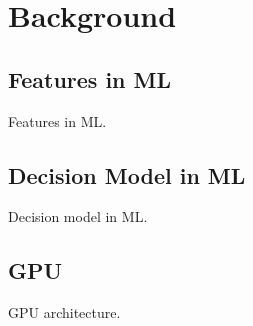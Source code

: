 \section{Background}

\subsection{Features in ML}



Features in ML.

\subsection{Decision Model in ML}




Decision model in ML.

\subsection{GPU}

GPU architecture.
